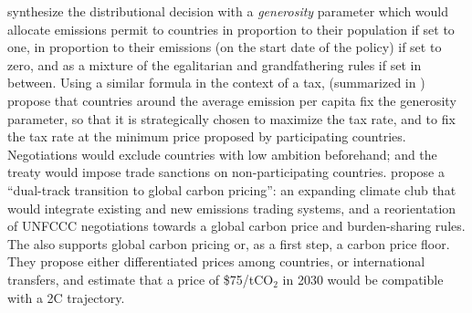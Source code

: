 \citet{gollier_negotiating_2015} synthesize the distributional decision with a \textit{generosity} parameter which would allocate emissions permit to countries in proportion to their population if set to one, in proportion to their emissions (on the start date of the policy) if set to zero, and as a mixture of the egalitarian and grandfathering rules if set in between. Using a similar formula in the context of a tax, \citet{cramton_international_2015} (summarized in \citealp{mackay_price_2015}) propose that countries around the average emission per capita fix the generosity parameter, so that it is strategically chosen to maximize the tax rate, and to fix the tax rate at the minimum price proposed by participating countries. Negotiations would exclude countries with low ambition beforehand; and the treaty would impose trade sanctions on non-participating countries. %
\citet{bergh_dual-track_2020} propose a ``dual-track transition to global carbon pricing'': an expanding climate club that would integrate existing and new emissions trading systems, and a reorientation of UNFCCC negotiations towards a global carbon price and burden-sharing rules. 
The \citet{imf_how_2019} also supports global carbon pricing or, as a first step, a carbon price floor. They propose either differentiated prices among countries, or international transfers, and estimate that a price of \$75/tCO$_\text{2}$ in 2030 would be compatible with a 2\textdegree{}C trajectory. %

